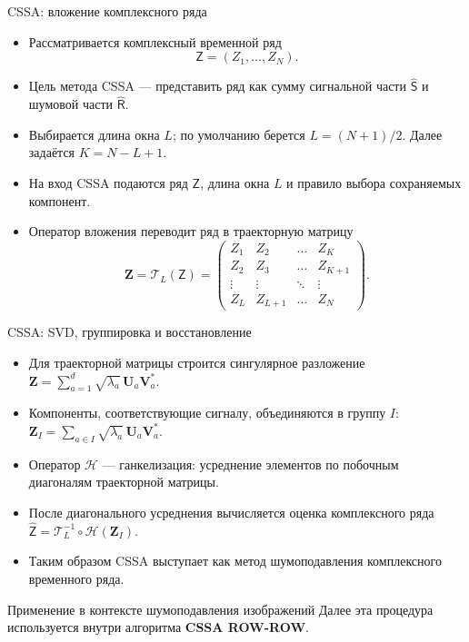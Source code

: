 \documentclass[unicode,notheorems]{beamer}
\begin{document}
\begin{frame}{CSSA: вложение комплексного ряда}
	\small
	\begin{itemize}
		\item Рассматривается комплексный временной ряд
		\[
		\mathsf{Z} = (Z_1,\dots,Z_N).
		\]
		\item Цель метода CSSA --- представить ряд как сумму сигнальной части $\widehat{\mathsf{S}}$ и шумовой части $\widehat{\mathsf{R}}$.
		\item Выбирается длина окна $L$; по умолчанию берется $L=(N+1)/2$. Далее задаётся $K = N - L + 1$.
		\item На вход CSSA подаются ряд $\mathsf{Z}$, длина окна $L$ и правило выбора сохраняемых компонент.
		\item Оператор вложения переводит ряд в траекторную матрицу
		\[
		\mathbf{Z} = \mathcal{T}_L(\mathsf{Z}) =
		\begin{pmatrix}
			Z_1 & Z_2 & \dots & Z_K \\
			Z_2 & Z_3 & \dots & Z_{K+1} \\
			\vdots & \vdots & \ddots & \vdots \\
			Z_L & Z_{L+1} & \dots & Z_N
		\end{pmatrix}.
		\]
	\end{itemize}
\end{frame}

\begin{frame}{CSSA: SVD, группировка и восстановление}
	\small
	\begin{itemize}
		\item Для траекторной матрицы строится сингулярное разложение
		$\mathbf{Z} = \sum_{a=1}^{d} \sqrt{\lambda_a}\,\mathbf{U}_a \mathbf{V}_a^{*}$.
		\item Компоненты, соответствующие сигналу, объединяются в группу $I$:
		$\mathbf{Z}_{I} = \sum_{a\in I} \sqrt{\lambda_a}\,\mathbf{U}_a \mathbf{V}_a^{*}$.
		\item Оператор $\mathcal{H}$ --- ганкелизация: усреднение элементов по побочным диагоналям траекторной матрицы.
		\item После диагонального усреднения вычисляется оценка комплексного ряда
		$\widehat{\mathsf{Z}} = \mathcal{T}_L^{-1}\circ\mathcal{H}(\mathbf{Z}_{I})$.
		\item Таким образом CSSA выступает как метод шумоподавления комплексного временного ряда.
	\end{itemize}

	\begin{block}{Применение в контексте шумоподавления изображений}
		Далее эта процедура используется внутри алгоритма \textbf{CSSA ROW-ROW}.
	\end{block}
\end{frame}
\end{document}
